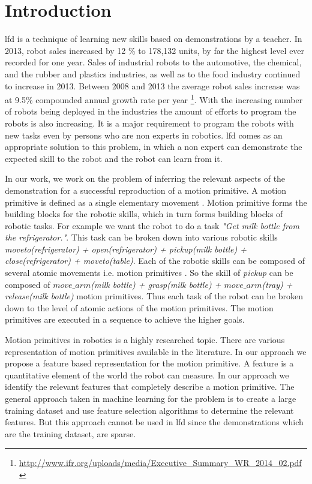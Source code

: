\section{Introduction} 
\acrfull{lfd} is a technique of learning new skills based on
demonstrations by a teacher\cite{argall_survey_2009}. In 2013, robot sales
increased by 12 \% to 178,132 units, by far the highest level ever recorded for
one year. Sales of industrial robots to the automotive, the chemical, and the
rubber and plastics industries, as well as to the food industry continued to
increase in 2013. Between 2008 and 2013 the average robot sales increase was at
9.5\% compounded annual growth rate per year
\footnote{\url{http://www.ifr.org/uploads/media/Executive_Summary_WR_2014_02.pdf
}}. With the increasing number of robots being deployed in the industries the
amount of efforts to program the robots is also increasing. It is a major
requirement to program the robots with new tasks even by persons who are non
experts in robotics. \acrshort{lfd} comes as an appropriate solution to this problem, in
which a non expert can demonstrate the expected skill to the robot and the
robot can learn from it.


In our work, we work on the problem of inferring the relevant aspects of the
demonstration for a successful reproduction of a motion primitive. A motion
primitive is defined as a single elementary movement
\cite{schaal_nonlinear_2000}. Motion primitive forms the building blocks for
the robotic skills, which in turn forms building blocks of robotic tasks. For
example we want the robot to do a task \textit{"Get milk bottle from the
refrigerator."}. This task can be broken down into various robotic skills
\textit{moveto(refrigerator) + open(refrigerator) + pickup(milk bottle) +
close(refrigerator) + moveto(table)}. Each of the robotic skills can be
composed of several atomic movements i.e. motion primitives . So the skill of
\textit{pickup} can be composed of \textit{$move\_arm$(milk bottle) + grasp(milk
bottle) + $move\_arm$(tray) + release(milk bottle)} motion primitives. Thus each
task of the robot can be broken down to the level of atomic actions of the
motion primitives. The motion primitives are executed in a sequence to achieve
the higher goals.

Motion primitives in robotics is a highly researched topic. There are various
representation of motion primitives available in the literature. In our
approach we propose a feature based representation for the motion primitive. A
feature is a quantitative element of the world the robot can measure. In our
approach we identify the relevant features that completely describe a motion
primitive. The general approach taken in machine learning for the problem is to
create a large training dataset and use feature selection algorithms to
determine the relevant features. But this approach cannot be used in \acrshort{lfd} since
the demonstrations which are the training dataset, are sparse.


